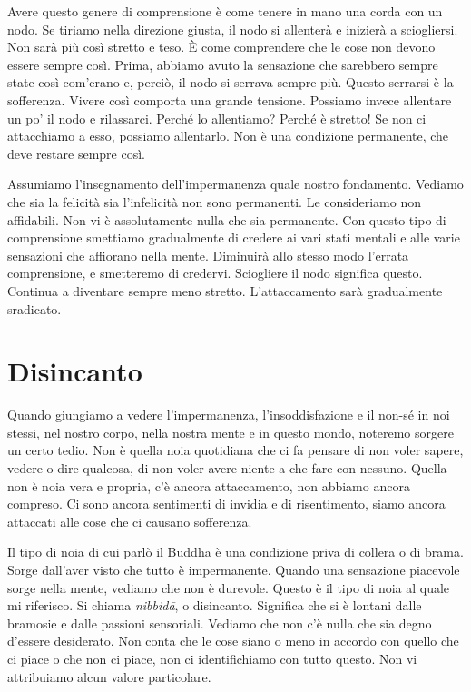 Avere questo genere di comprensione è come tenere in mano una corda con
un nodo. Se tiriamo nella direzione giusta, il nodo si allenterà e
inizierà a sciogliersi. Non sarà più così stretto e teso. È come
comprendere che le cose non devono essere sempre così. Prima, abbiamo
avuto la sensazione che sarebbero sempre state così com'erano e, perciò,
il nodo si serrava sempre più. Questo serrarsi è la sofferenza. Vivere
così comporta una grande tensione. Possiamo invece allentare un po' il
nodo e rilassarci. Perché lo allentiamo? Perché è stretto! Se non ci
attacchiamo a esso, possiamo allentarlo. Non è una condizione
permanente, che deve restare sempre così.

Assumiamo l'insegnamento dell'impermanenza quale nostro fondamento.
Vediamo che sia la felicità sia l'infelicità non sono permanenti. Le
consideriamo non affidabili. Non vi è assolutamente nulla che sia
permanente. Con questo tipo di comprensione smettiamo gradualmente di
credere ai vari stati mentali e alle varie sensazioni che affiorano
nella mente. Diminuirà allo stesso modo l'errata comprensione, e
smetteremo di credervi. Sciogliere il nodo significa questo. Continua a
diventare sempre meno stretto. L'attaccamento sarà gradualmente
sradicato.

\section{Disincanto}

Quando giungiamo a vedere l'impermanenza, l'insoddisfazione e il non-sé
in noi stessi, nel nostro corpo, nella nostra mente e in questo mondo,
noteremo sorgere un certo tedio. Non è quella noia quotidiana che ci fa
pensare di non voler sapere, vedere o dire qualcosa, di non voler avere
niente a che fare con nessuno. Quella non è noia vera e propria, c'è
ancora attaccamento, non abbiamo ancora compreso. Ci sono ancora
sentimenti di invidia e di risentimento, siamo ancora attaccati alle
cose che ci causano sofferenza.

Il tipo di noia di cui parlò il Buddha è una condizione priva di collera
o di brama. Sorge dall'aver visto che tutto è impermanente. Quando una
sensazione piacevole sorge nella mente, vediamo che non è durevole.
Questo è il tipo di noia al quale mi riferisco. Si chiama
\emph{nibbidā}, o disincanto. Significa che si è lontani dalle bramosie
e dalle passioni sensoriali. Vediamo che non c'è nulla che sia degno
d'essere desiderato. Non conta che le cose siano o meno in accordo con
quello che ci piace o che non ci piace, non ci identifichiamo con tutto
questo. Non vi attribuiamo alcun valore particolare.

